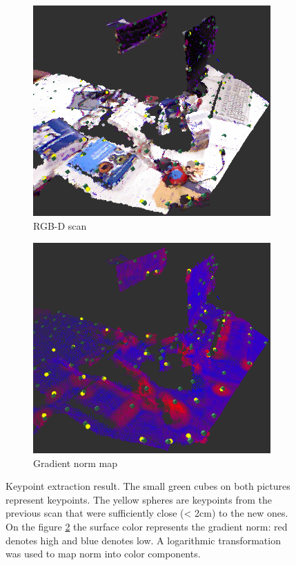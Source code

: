 \begin{figure}
\centering
       \begin{subfigure}[b]{0.45\textwidth}
                \includegraphics[width=\textwidth]{table018.png}
                \caption{RGB-D scan}
                \label{figure:rgbds}
       \end{subfigure}
       \begin{subfigure}[b]{0.45\textwidth}
                \includegraphics[width=\textwidth]{table018blue.png}
                \caption{Gradient norm map}
                \label{figure:gnm}
       \end{subfigure}
       \caption{Keypoint extraction result. The small green cubes on both pictures represent keypoints. The yellow spheres are keypoints from the previous scan that were sufficiently close (< 2cm) to the new ones. On the figure \ref{figure:gnm} the surface color represents the gradient norm: red denotes high and blue denotes low. A logarithmic transformation was used to map norm into color components.}
       \label{figure:qresult}
\end{figure}


